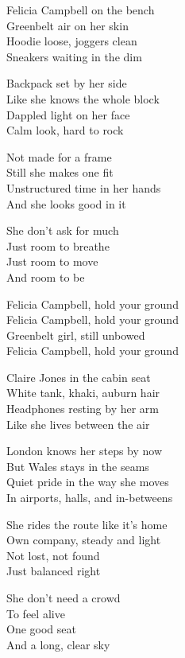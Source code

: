 \begin{lyrics}
Felicia Campbell on the bench\\
Greenbelt air on her skin\\
Hoodie loose, joggers clean\\
Sneakers waiting in the dim

Backpack set by her side\\
Like she knows the whole block\\
Dappled light on her face\\
Calm look, hard to rock

Not made for a frame\\
Still she makes one fit\\
Unstructured time in her hands\\
And she looks good in it

She don’t ask for much\\
Just room to breathe\\
Just room to move\\
And room to be

Felicia Campbell, hold your ground\\
Felicia Campbell, hold your ground\\
Greenbelt girl, still unbowed\\
Felicia Campbell, hold your ground

Claire Jones in the cabin seat\\
White tank, khaki, auburn hair\\
Headphones resting by her arm\\
Like she lives between the air

London knows her steps by now\\
But Wales stays in the seams\\
Quiet pride in the way she moves\\
In airports, halls, and in-betweens

She rides the route like it's home\\
Own company, steady and light\\
Not lost, not found\\
Just balanced right

She don’t need a crowd\\
To feel alive\\
One good seat\\
And a long, clear sky


\end{lyrics}
